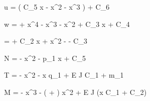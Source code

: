 u =  \left( C_5 x -  x^2 - x^3 \right) + C_6

w =  +  x^4 -  x^3 
      -  x^2  + C_3 x + C_4

\theta 
  =  + C_2 x +  x^2 
      -  - C_3

N = -  x^2 - p_1 x + C_5 

T = -  x^2 - x q_1 + E J C_1 + m_1 

M = - x^3 - \left(  +  \right) x^2 + E J  (x C_1 + C_2) 
